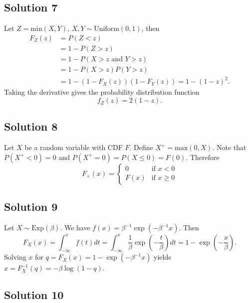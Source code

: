\subsection*{Solution 7}

Let $Z = \mathrm{min}(X, Y)$, $X, Y \sim \mathrm{Uniform}(0, 1)$, then
\begin{equation*}
\begin{split}
F_Z(z) &= P(Z < z) \\
    &= 1 - P(Z > z) \\
    &= 1 - P(X > z \text{ and } Y > z) \\
    &= 1 - P(X > z)P(Y > z) \\
    &= 1 -(1 - F_X(z))(1 - F_Y(z))
    = 1 - (1 - z)^2.
\end{split}
\end{equation*}
Taking the derivative gives the probability distribution function
$$
f_Z(z) = 2 (1 - z).
$$


\subsection*{Solution 8}

Let $X$ be a random variable with CDF $F$.
Define $X^+ = \mathrm{max}(0, X)$.
Note that $P(X^+ < 0) = 0$ and $P(X^+ = 0) = P(X \leq 0) = F(0)$.
Therefore
\begin{equation*}
    F_+(x) = \left\{ \begin{array}{ll}
        0 & \text{if } x < 0 \\
        F(x) & \text{if } x \geq 0
    \end{array} \right.
\end{equation*}


\subsection*{Solution 9}

Let $X \sim \mathrm{Exp}(\beta)$.
We have $f(x) = \beta^{-1} \exp(-\beta^{-1}x)$.
Then
$$
F_X(x) = \int_{-\infty}^x f(t)dt
    = \int_{-\infty}^x \frac{1}{\beta} \exp\left(-\frac{t}{\beta}\right) dt
    = 1 - \exp\left(-\frac{x}{\beta}\right).
$$
Solving $x$ for $q = F_X(x) = 1 - \exp(-\beta^{-1}x)$ yields $x = F_X^{-1}(q) = -\beta \log(1 - q)$.


\subsection*{Solution 10}

